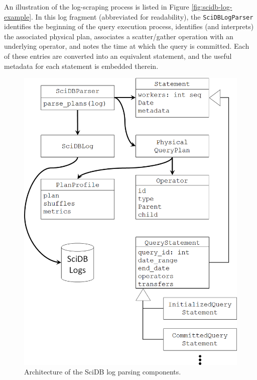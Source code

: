 \documentclass{chi2009}
\begin{document}
An illustration of the log-scraping process is listed in Figure \ref{fig:scidb-log-example}.  In this log fragment (abbreviated for readability), the \texttt{SciDBLogParser} identifies the beginning of the query execution process, identifies (and interprets) the associated physical plan, associates a scatter/gather operation with an underlying operator, and notes the time at which the query is committed.  Each of these entries are converted into an equivalent statement, and the useful metadata for each statement is embedded therein.



\begin{figure}[h]
\begin{center}
\includegraphics[scale=0.25]{log-scraping.png}
\end{center}
\caption{Architecture of the SciDB log parsing components.}
\label{fig:scidb-log-parsing}
\end{figure}
\end{document}
